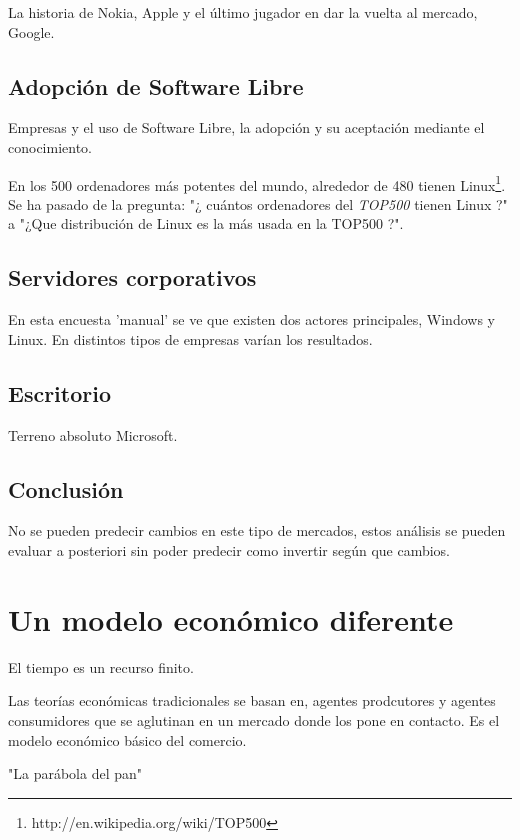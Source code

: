 \documentclass[11pt]{scrartcl}
\begin{document}
La historia de Nokia, Apple y el último jugador en dar la vuelta al mercado, Google.

\subsection{Adopción de Software Libre}

Empresas y el uso de Software Libre, la adopción y su aceptación mediante el conocimiento.

En los 500 ordenadores más potentes del mundo, alrededor de 480 tienen Linux\footnote{http://en.wikipedia.org/wiki/TOP500}. Se ha pasado de la pregunta: "¿ cuántos ordenadores del  \emph{TOP500} tienen Linux ?" a "¿Que distribución de Linux es la más usada en la TOP500 ?".

\subsection{Servidores corporativos}

En esta encuesta 'manual' se ve que existen dos actores principales, Windows y Linux. En distintos tipos de empresas varían los resultados.

\subsection{Escritorio}

Terreno absoluto Microsoft.

\subsection{Conclusión}

No se pueden predecir cambios en este tipo de mercados, estos análisis se pueden evaluar a posteriori sin poder predecir como invertir según que cambios.

\section{Un modelo económico diferente}

El tiempo es un recurso finito.

Las teorías económicas tradicionales se basan en, agentes prodcutores y agentes consumidores que se aglutinan en un mercado donde los pone en contacto. Es el modelo económico básico del comercio.

"La parábola del pan" %
\end{document}
